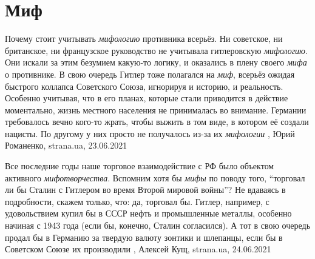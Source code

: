  
 
 
 
 
\chapter{Миф}
\label{sec:slova.mif}

Почему стоит учитывать \emph{мифологию} противника всерьёз.  Ни советское, ни
британское, ни французское руководство не учитывала гитлеровскую
\emph{мифологию}. Они искали за этим безумием какую-то логику, и оказались в
плену своего \emph{мифа} о противнике. В свою очередь Гитлер тоже полагался на
\emph{миф}, всерьёз ожидая быстрого коллапса Советского Союза, игнорируя и
историю, и реальность. Особенно учитывая, что в его планах, которые стали
приводится в действие моментально, жизнь местного населения не принималась во
внимание. Германии требовалось вечно кого-то жрать, чтобы выжить в том виде, в
котором её создали нацисты. По другому у них просто не получалось из-за их
\emph{мифологии}
, 
Юрий Романенко, strana.ua, 23.06.2021

Все последние годы наше торговое взаимодействие с РФ было объектом активного
\emph{мифотворчества}. Вспомним хотя бы \emph{мифы} по поводу того,
\enquote{торговал ли бы Сталин с Гитлером во время Второй мировой войны}? Не
вдаваясь в подробности, скажем только, что: да, торговал бы.  Гитлер, например,
с удовольствием купил бы в СССР нефть и промышленные металлы, особенно начиная
с 1943 года (если бы, конечно, Сталин согласился). А тот в свою очередь продал
бы в Германию за твердую валюту зонтики и шлепанцы, если бы в Советском Союзе
их производили
, 
Алексей Кущ, strana.ua, 24.06.2021

